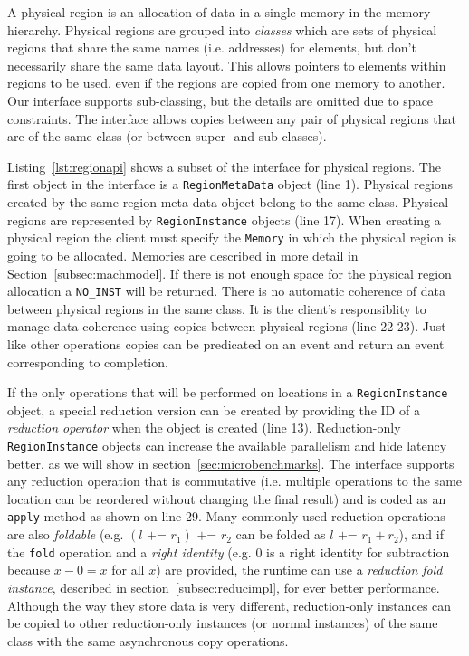 A physical region is an allocation of data in a single memory in the memory hierarchy.  Physical
regions are grouped into {\em classes} which are sets of physical regions that share the
same names (i.e. addresses) for elements, but don't necessarily share the same data layout.  This
allows pointers to elements within regions to be used, even if the regions are copied from one memory
to another.  Our
interface supports sub-classing, but the details are omitted due to space constraints.  The
interface allows copies between any pair of physical regions that are of
the same class (or between super- and sub-classes).  



Listing~\ref{lst:regionapi} shows a subset of the interface for physical regions.  The
first object in the interface is a {\tt RegionMetaData} object (line 1).  Physical
regions created by the same region meta-data object belong to the same class.  Physical
regions are represented by {\tt RegionInstance} objects (line 17).  When creating a physical
region the client must specify the {\tt Memory} in which the physical region is going
to be allocated.  Memories are described in more detail in Section~\ref{subsec:machmodel}.
If there is not enough space for the physical region allocation a {\tt NO\_INST} will
be returned.  There is no automatic coherence of data between physical regions in the
same class.  It is the client's responsiblity to manage data coherence using copies
between physical regions (line 22-23).  Just like other operations copies can be
predicated on an event and return an event corresponding to completion.

If the only operations that will be performed on locations in a {\tt RegionInstance} object,
a special reduction version can be created by providing the ID of a {\em reduction operator}
when the object is created (line 13).  Reduction-only {\tt RegionInstance} objects can 
increase the available parallelism and hide latency better, as we will show in section~\ref{sec:microbenchmarks}.  The interface supports any reduction operation that
is commutative (i.e. multiple operations to the same location can be reordered without 
changing the final result) and is coded as an {\tt apply} method as shown on line 29.
Many commonly-used reduction operations are also {\em foldable} (e.g. $(l \text{ += } r_1) \text{ += } r_2$ can
be folded as $l \text{ += } r_1 + r_2$), and if the {\tt fold} operation and a {\em right identity}
(e.g. $0$ is a right identity for subtraction because $x - 0 = x$ for all $x$) are provided,
the runtime can use a {\em reduction fold instance}, described in section~\ref{subsec:reducimpl},
for ever better performance.  Although the way they store data is very different,
reduction-only instances can be copied to other reduction-only instances (or normal 
instances) of the same class with the same asynchronous copy operations.

